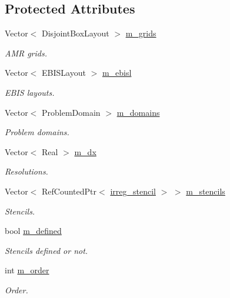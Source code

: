 \subsection*{Protected Attributes}
\begin{DoxyCompactItemize}
\item 
Vector$<$ Disjoint\+Box\+Layout $>$ \hyperlink{classirreg__amr__stencil_a54f0ac2e87963c4c65c09ad4ec8b28c8}{m\+\_\+grids}
\begin{DoxyCompactList}\small\item\em A\+MR grids. \end{DoxyCompactList}\item 
Vector$<$ E\+B\+I\+S\+Layout $>$ \hyperlink{classirreg__amr__stencil_a290ad2f3e656239f0bf2008df5355cef}{m\+\_\+ebisl}
\begin{DoxyCompactList}\small\item\em E\+B\+IS layouts. \end{DoxyCompactList}\item 
Vector$<$ Problem\+Domain $>$ \hyperlink{classirreg__amr__stencil_ac71ace8f7e0435f40567e3aaa23bc98f}{m\+\_\+domains}
\begin{DoxyCompactList}\small\item\em Problem domains. \end{DoxyCompactList}\item 
Vector$<$ Real $>$ \hyperlink{classirreg__amr__stencil_a9ecea0f6fdf4c2cf054784ceb7c77a8f}{m\+\_\+dx}
\begin{DoxyCompactList}\small\item\em Resolutions. \end{DoxyCompactList}\item 
Vector$<$ Ref\+Counted\+Ptr$<$ \hyperlink{classirreg__stencil}{irreg\+\_\+stencil} $>$ $>$ \hyperlink{classirreg__amr__stencil_a67802854fbf394c876d2727b11c78e35}{m\+\_\+stencils}
\begin{DoxyCompactList}\small\item\em Stencils. \end{DoxyCompactList}\item 
bool \hyperlink{classirreg__amr__stencil_ac9c1b87a0a04184fe0ebb9747525d88b}{m\+\_\+defined}
\begin{DoxyCompactList}\small\item\em Stencils defined or not. \end{DoxyCompactList}\item 
int \hyperlink{classirreg__amr__stencil_a7ec2ca575e1c50f7d6265db198b18c8e}{m\+\_\+order}
\begin{DoxyCompactList}\small\item\em Order. \end{DoxyCompactList}\item 

\end{DoxyCompactItemize}
